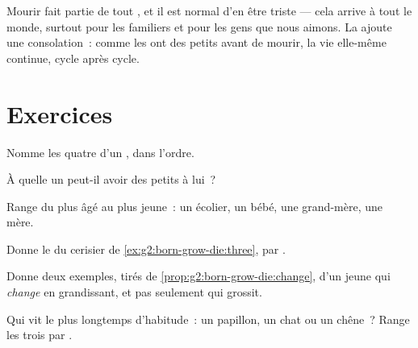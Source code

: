 \begin{remark}\label{rem:g2:born-grow-die:death}
Mourir fait partie de tout , et il est normal d'en être
triste --- cela arrive à tout le monde, surtout pour les 
familiers et pour les gens que nous aimons. La  ajoute une
consolation~: comme les  ont des petits avant de mourir, la
vie elle-même continue, cycle après cycle.
\end{remark}

\section{Exercices}

\begin{exercise}[$\star$]\label{exo:g2:born-grow-die:1}
Nomme les quatre  d'un , dans l'ordre.
\end{exercise}

\begin{exercise}[$\star$]\label{exo:g2:born-grow-die:2}
À quelle  un  peut-il avoir des petits à lui~?
\end{exercise}

\begin{exercise}[$\star$]\label{exo:g2:born-grow-die:3}
Range du plus âgé au plus jeune~: un écolier, un bébé, une
grand-mère, une mère.
\end{exercise}

\begin{exercise}[$\star$]\label{exo:g2:born-grow-die:4}
Donne le  du cerisier de
\cref{ex:g2:born-grow-die:three},  par .
\end{exercise}

\begin{exercise}[$\star$]\label{exo:g2:born-grow-die:5}
Donne deux exemples, tirés de \cref{prop:g2:born-grow-die:change},
d'un jeune  qui \emph{change} en grandissant, et pas
seulement qui grossit.
\end{exercise}

\begin{exercise}[$\star$]\label{exo:g2:born-grow-die:6}
Qui vit le plus longtemps d'habitude~: un papillon, un chat ou un
chêne~? Range les trois par .
\end{exercise}

